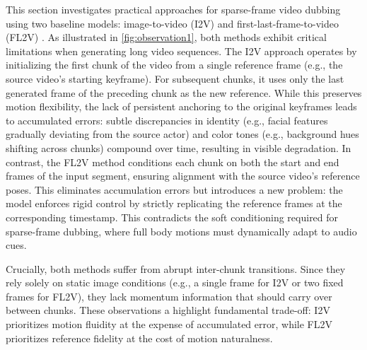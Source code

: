 This section investigates practical approaches for sparse-frame video dubbing using two baseline models: image-to-video (I2V) \cite{cui2024hallo3} and first-last-frame-to-video (FL2V) \cite{wan}. As illustrated in \cref{fig:observation1}, both methods exhibit critical limitations when generating long video sequences. The I2V approach operates by initializing the first chunk of the video from a single reference frame (e.g., the source video’s starting keyframe). For subsequent chunks, it uses only the last generated frame of the preceding chunk as the new reference. While this preserves motion flexibility, the lack of persistent anchoring to the original keyframes leads to accumulated errors: subtle discrepancies in identity (e.g., facial features gradually deviating from the source actor) and color tones (e.g., background hues shifting across chunks) compound over time, resulting in visible degradation. In contrast, the FL2V method conditions each chunk on both the start and end frames of the input segment, ensuring alignment with the source video’s reference poses. This eliminates accumulation errors but introduces a new problem: the model enforces rigid control by strictly replicating the reference frames at the corresponding timestamp. This contradicts the soft conditioning required for sparse-frame dubbing, where full body motions must dynamically adapt to audio cues.

Crucially, both methods suffer from abrupt inter-chunk transitions. Since they rely solely on static image conditions (e.g., a single frame for I2V or two fixed frames for FL2V), they lack momentum information that should carry over between chunks. These observations a highlight fundamental trade-off: I2V prioritizes motion fluidity at the expense of accumulated error, while FL2V prioritizes reference fidelity at the cost of motion naturalness.


